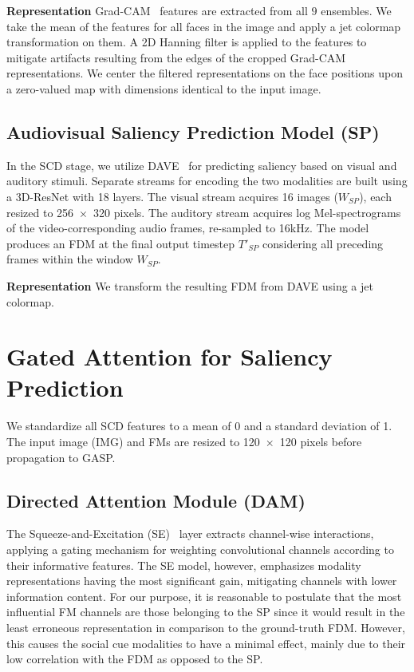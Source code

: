 \documentclass{article}
\begin{document}
\textbf{Representation}
Grad-CAM~\cite{selvaraju2017grad} features are extracted from all $9$ ensembles. We take the mean of the features for all faces in the image and apply a jet colormap transformation on them. A 2D Hanning filter is applied to the features to mitigate artifacts resulting from the edges of the cropped Grad-CAM representations. We center the filtered representations on the face positions upon a zero-valued map with dimensions identical to the input image.

\subsection{Audiovisual Saliency Prediction Model (SP)}

In the SCD stage, we utilize DAVE~\cite{tavakoli2020deep} for predicting saliency based on visual and auditory stimuli. Separate streams for encoding the two modalities are built using a 3D-ResNet with 18 layers. The visual stream acquires 16 images ($W_{SP}$), each resized to 256~$\times$~320 pixels. 
The auditory stream acquires log Mel-spectrograms of the video-corresponding audio frames, re-sampled to 16kHz. The model produces an FDM at the final output timestep $T'_{SP}$ considering all preceding frames within the window $W_{SP}$.

\textbf{Representation}
We transform the resulting FDM from DAVE using a jet colormap.

\section{Gated Attention for Saliency Prediction}
\label{sec:stage2}

We standardize all SCD features to a mean of 0 and a standard deviation of 1. The input image (IMG) and FMs are resized to 120~$\times$~120 pixels before propagation to GASP. 

\subsection{Directed Attention Module (DAM)}

The Squeeze-and-Excitation (SE)~\cite{hu2018squeeze} layer extracts channel-wise interactions, applying a gating mechanism for weighting convolutional channels according to their informative features. The SE model, however, emphasizes modality representations having the most significant gain, mitigating channels with lower information content. For our purpose, it is reasonable to postulate that the most influential FM channels are those belonging to the SP since it would result in the least erroneous representation in comparison to the ground-truth FDM. However, this causes the social cue modalities to have a minimal effect, mainly due to their low correlation with the FDM as opposed to the SP.
\end{document}
